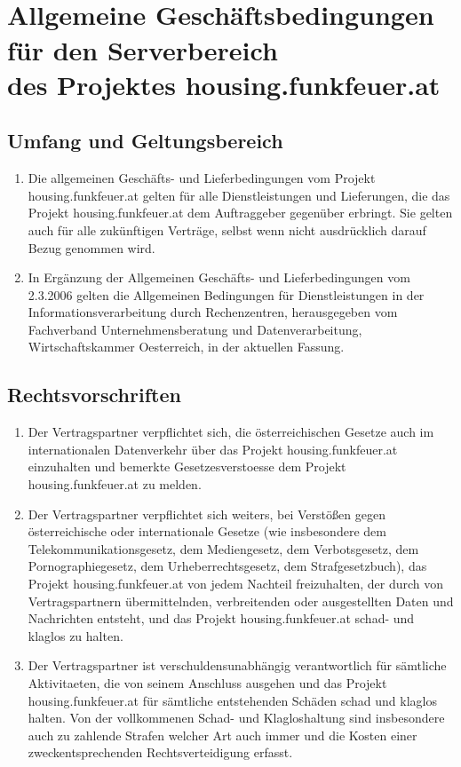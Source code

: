 \documentclass[parskip=half]{article}
\begin{document}
\thispagestyle{fancy}
\section*{\\Allgemeine Geschäftsbedingungen für den Serverbereich \\ des
Projektes housing.funkfeuer.at}

\subsection{Umfang und Geltungsbereich}
\begin{enumerate}
\item Die allgemeinen Geschäfts- und Lieferbedingungen vom Projekt
housing.funkfeuer.at gelten für alle Dienstleistungen und Lieferungen, die das
Projekt housing.funkfeuer.at dem Auftraggeber gegenüber erbringt. Sie gelten
auch für alle zukünftigen Verträge, selbst wenn nicht ausdrücklich darauf
Bezug genommen wird.
\item In Ergänzung der Allgemeinen Geschäfts- und Lieferbedingungen vom
2.3.2006 gelten die Allgemeinen Bedingungen für Dienstleistungen in der
Informationsverarbeitung durch Rechenzentren, herausgegeben vom Fachverband
Unternehmensberatung und Datenverarbeitung, Wirtschaftskammer Oesterreich,
in der aktuellen Fassung.
\end{enumerate}

\subsection{ Rechtsvorschriften}
\begin{enumerate}
\item Der Vertragspartner verpflichtet sich, die österreichischen Gesetze auch im
internationalen Datenverkehr über das Projekt housing.funkfeuer.at einzuhalten und
bemerkte Gesetzesverstoesse dem Projekt housing.funkfeuer.at zu melden.
\item Der Vertragspartner verpflichtet sich weiters, bei Verstößen gegen österreichische
oder internationale Gesetze (wie insbesondere dem Telekommunikationsgesetz, dem
Mediengesetz, dem Verbotsgesetz, dem Pornographiegesetz, dem Urheberrechtsgesetz,
dem Strafgesetzbuch), das Projekt housing.funkfeuer.at von jedem Nachteil freizuhalten,
der durch von Vertragspartnern übermittelnden, verbreitenden oder ausgestellten Daten
und Nachrichten entsteht, und das Projekt housing.funkfeuer.at schad- und klaglos zu
halten.
\item Der Vertragspartner ist verschuldensunabhängig verantwortlich für sämtliche
Aktivitaeten, die von seinem Anschluss ausgehen und das Projekt housing.funkfeuer.at für
sämtliche entstehenden Schäden schad und klaglos halten. Von der vollkommenen Schad- und
Klagloshaltung sind insbesondere auch zu zahlende Strafen welcher Art auch immer und die
Kosten einer zweckentsprechenden Rechtsverteidigung erfasst.
\end{enumerate}
\end{document}
